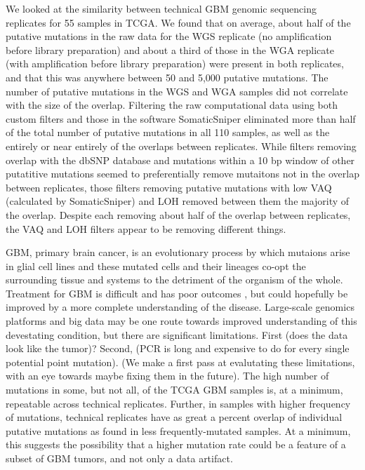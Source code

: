 \documentclass[11pt]{article} %
\begin{document}
We looked at the similarity between technical GBM genomic sequencing replicates for 55 samples in TCGA. We found that on average, about half of the putative mutations in the raw data for the WGS replicate (no amplification before library preparation) and about a third of those in the WGA replicate (with amplification before library preparation) were present in both replicates, and that this was anywhere between 50 and 5,000 putative mutations. The number of putative mutations in the WGS and WGA samples did not correlate with the size of the overlap. Filtering the raw computational data using both custom filters and those in the software SomaticSniper eliminated more than half of the total number of putative mutations in all 110 samples, as well as the entirely or near entirely of the overlaps between replicates. While filters removing overlap with the dbSNP database and mutations within a 10 bp window of other putatitive mutations seemed to preferentially remove mutaitons not in the overlap between replicates, those filters removing putative mutations with low VAQ (calculated by SomaticSniper) and LOH removed between them the majority of the overlap. Despite each removing about half of the overlap between replicates, the VAQ and LOH filters appear to be removing different things.

GBM, primary brain cancer, is an evolutionary process by which mutaions arise in glial cell lines and these mutated cells and their lineages co-opt the surrounding tissue and systems to the detriment of the organism of the whole. Treatment for GBM is difficult and has poor outcomes \cite{GBM-treatments}, but could hopefully be improved by a more complete understanding of the disease. Large-scale genomics platforms and big data may be one route towards improved understanding of this devestating condition, but there are significant limitations. First (does the data look like the tumor)? Second, (PCR is long and expensive to do for every single potential point mutation). (We make a first pass at evalutating these limitations, with an eye towards maybe fixing them in the future).   
The high number of mutations in some, but not all, of the TCGA GBM samples is, at a minimum, repeatable across technical replicates. Further, in samples with higher frequency of mutations, technical replicates have as great a percent overlap of individual putative mutations as found in less frequently-mutated samples. At a minimum, this suggests the possibility that a higher mutation rate could be a feature of a subset of GBM tumors, and not only a data artifact.
\end{document}
